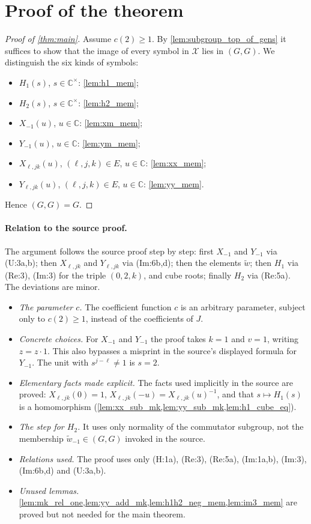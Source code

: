 \documentclass[11pt]{article}
\theoremstyle{definition}
\theoremstyle{remark}
\newcommand{\C}{\mathbb{C}}
\newcommand{\Cx}{\mathbb{C}^{\times}}
\newcommand{\wt}{\widetilde{w}}
\newcommand{\comm}{(G,G)}
\begin{document}
\section{Proof of the theorem}

\begin{proof}[Proof of \cref{thm:main}]
Assume $c(2)\ge 1$. By \cref{lem:subgroup_top_of_gens} it suffices to show that the image of every symbol in $\mathcal X$ lies in $\comm$. We distinguish the six kinds of symbols:
\begin{itemize}
\item $H_1(s)$, $s\in\Cx$: \cref{lem:h1_mem};
\item $H_2(s)$, $s\in\Cx$: \cref{lem:h2_mem};
\item $X_{-1}(u)$, $u\in\C$: \cref{lem:xm_mem};
\item $Y_{-1}(u)$, $u\in\C$: \cref{lem:ym_mem};
\item $X_{\ell,jk}(u)$, $(\ell,j,k)\in E$, $u\in\C$: \cref{lem:xx_mem};
\item $Y_{\ell,jk}(u)$, $(\ell,j,k)\in E$, $u\in\C$: \cref{lem:yy_mem}.
\end{itemize}
Hence $\comm=G$.
\end{proof}

\paragraph{Relation to the source proof.}
The argument follows the source proof step by step: first $X_{-1}$ and $Y_{-1}$ via (U:3a,b); then $X_{\ell,jk}$ and $Y_{\ell,jk}$ via (Im:6b,d); then the elements $\wt$; then $H_1$ via (Re:3), (Im:3) for the triple $(0,2,k)$, and cube roots; finally $H_2$ via (Re:5a). The deviations are minor.
\begin{itemize}
\item \emph{The parameter $c$.} The coefficient function $c$ is an arbitrary parameter, subject only to $c(2)\ge 1$, instead of the coefficients of $J$.
\item \emph{Concrete choices.} For $X_{-1}$ and $Y_{-1}$ the proof takes $k=1$ and $v=1$, writing $z=z\cdot 1$. This also bypasses a misprint in the source's displayed formula for $Y_{-1}$. The unit with $s^{j-\ell}\ne1$ is $s=2$.
\item \emph{Elementary facts made explicit.} The facts used implicitly in the source are proved: $X_{\ell,jk}(0)=1$, $X_{\ell,jk}(-u)=X_{\ell,jk}(u)^{-1}$, and that $s\mapsto H_1(s)$ is a homomorphism (\cref{lem:xx_sub_mk,lem:yy_sub_mk,lem:h1_cube_eq}).
\item \emph{The step for $H_2$.} It uses only normality of the commutator subgroup, not the membership $\wt_{-1}\in\comm$ invoked in the source.
\item \emph{Relations used.} The proof uses only (H:1a), (Re:3), (Re:5a), (Im:1a,b), (Im:3), (Im:6b,d) and (U:3a,b).
\item \emph{Unused lemmas.} \cref{lem:mk_rel_one,lem:yy_add_mk,lem:h1h2_neg_mem,lem:im3_mem} are proved but not needed for the main theorem.
\end{itemize}
\end{document}

